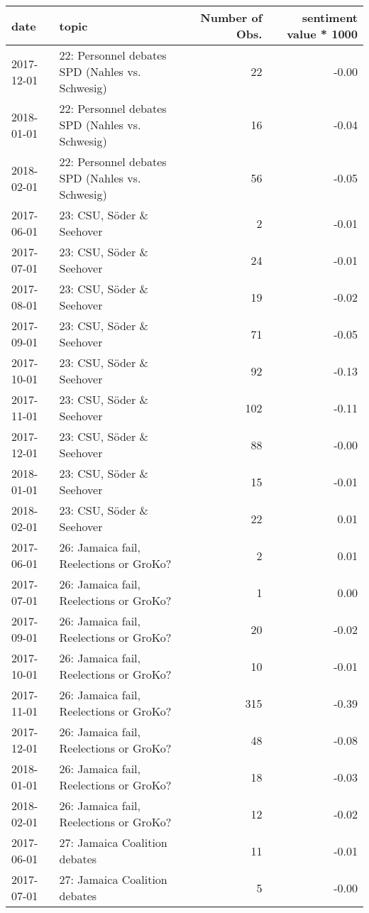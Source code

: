 \begin{table}[ht]
\centering
\begin{tabular}{llrr}
  \hline
date & topic & Number of Obs. & sentiment value * 1000 \\ 
  \hline
2017-12-01 & 22: Personnel debates SPD (Nahles vs. Schwesig) &  22 & -0.00 \\ 
  2018-01-01 & 22: Personnel debates SPD (Nahles vs. Schwesig) &  16 & -0.04 \\ 
  2018-02-01 & 22: Personnel debates SPD (Nahles vs. Schwesig) &  56 & -0.05 \\ 
  2017-06-01 & 23: CSU, Söder \& Seehover &   2 & -0.01 \\ 
  2017-07-01 & 23: CSU, Söder \& Seehover &  24 & -0.01 \\ 
  2017-08-01 & 23: CSU, Söder \& Seehover &  19 & -0.02 \\ 
  2017-09-01 & 23: CSU, Söder \& Seehover &  71 & -0.05 \\ 
  2017-10-01 & 23: CSU, Söder \& Seehover &  92 & -0.13 \\ 
  2017-11-01 & 23: CSU, Söder \& Seehover & 102 & -0.11 \\ 
  2017-12-01 & 23: CSU, Söder \& Seehover &  88 & -0.00 \\ 
  2018-01-01 & 23: CSU, Söder \& Seehover &  15 & -0.01 \\ 
  2018-02-01 & 23: CSU, Söder \& Seehover &  22 & 0.01 \\ 
  2017-06-01 & 26: Jamaica fail, Reelections or GroKo? &   2 & 0.01 \\ 
  2017-07-01 & 26: Jamaica fail, Reelections or GroKo? &   1 & 0.00 \\ 
  2017-09-01 & 26: Jamaica fail, Reelections or GroKo? &  20 & -0.02 \\ 
  2017-10-01 & 26: Jamaica fail, Reelections or GroKo? &  10 & -0.01 \\ 
  2017-11-01 & 26: Jamaica fail, Reelections or GroKo? & 315 & -0.39 \\ 
  2017-12-01 & 26: Jamaica fail, Reelections or GroKo? &  48 & -0.08 \\ 
  2018-01-01 & 26: Jamaica fail, Reelections or GroKo? &  18 & -0.03 \\ 
  2018-02-01 & 26: Jamaica fail, Reelections or GroKo? &  12 & -0.02 \\ 
  2017-06-01 & 27: Jamaica Coalition debates &  11 & -0.01 \\ 
  2017-07-01 & 27: Jamaica Coalition debates &   5 & -0.00 \\ 

\end{tabular}
\end{table}
